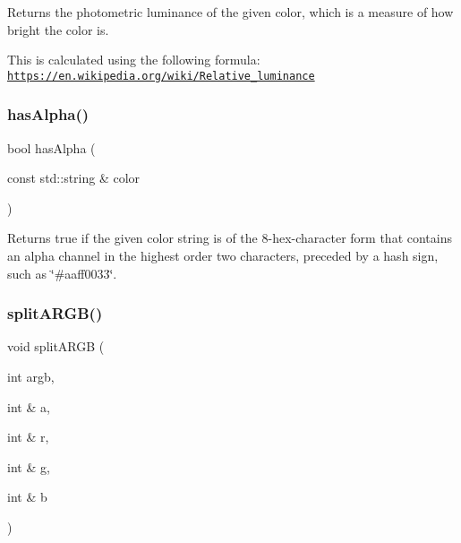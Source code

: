 Returns the photometric luminance of the given color, which is a measure of how bright the color is. 

This is calculated using the following formula\+: \href{https://en.wikipedia.org/wiki/Relative_luminance}{\tt https\+://en.\+wikipedia.\+org/wiki/\+Relative\+\_\+luminance} \mbox{\label{classsgl_1_1GColor_ac3793cbac78369b75b4d8967d8cb2b7a}} 
\subsubsection{\texorpdfstring{has\+Alpha()}{hasAlpha()}}
{\footnotesize\ttfamily bool has\+Alpha (\begin{DoxyParamCaption}\item[{const std\+::string \&}]{color }\end{DoxyParamCaption})\hspace{0.3cm}{\ttfamily [static]}}



Returns true if the given color string is of the 8-\/hex-\/character form that contains an alpha channel in the highest order two characters, preceded by a hash sign, such as \char`\"{}\#aaff0033\char`\"{}. 

\mbox{\label{classsgl_1_1GColor_aa0ad89394f00240bdc0ec3b893eca6aa}} 
\subsubsection{\texorpdfstring{split\+A\+R\+G\+B()}{splitARGB()}}
{\footnotesize\ttfamily void split\+A\+R\+GB (\begin{DoxyParamCaption}\item[{int}]{argb,  }\item[{int \&}]{a,  }\item[{int \&}]{r,  }\item[{int \&}]{g,  }\item[{int \&}]{b }\end{DoxyParamCaption})\hspace{0.3cm}{\ttfamily [static]}}



